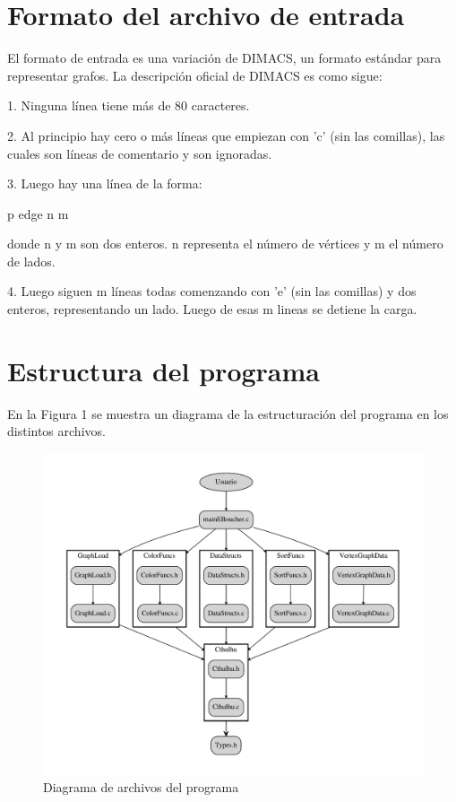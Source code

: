 \documentclass[11pt,a4paper]{article}
\theoremstyle{plain}
\begin{document}
\section{Formato del archivo de entrada}
\label{sec:2}

El formato de entrada es una variación de DIMACS, un formato estándar para representar grafos.
La descripción oficial de DIMACS es como sigue:

1. Ninguna línea tiene más de 80 caracteres.

2. Al principio hay cero o más líneas que empiezan con 'c' (sin las comillas), las cuales son líneas de comentario y son ignoradas.

3. Luego hay una línea de la forma:

p edge n m

donde n y m son dos enteros. n representa el número de vértices y m el número de lados.

4. Luego siguen m líneas todas comenzando con 'e' (sin las comillas) y dos enteros, representando un lado. Luego de esas m lineas se detiene la carga.

\newpage


\section{Estructura del programa}

En la Figura 1 se muestra un diagrama de la estructuración del programa en los distintos archivos.\\ 

\begin{figure}[htp]
\centering
\includegraphics[scale=0.65]{diagram.pdf}
{\caption{Diagrama de archivos del programa}}
\label{fig:1}
\end{figure}
\end{document}
